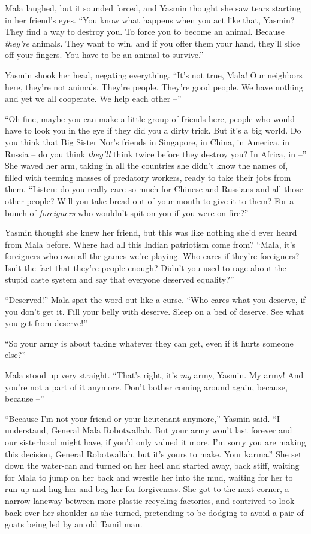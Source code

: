 Mala laughed, but it sounded forced, and Yasmin thought she saw
tears starting in her friend's eyes. ``You know what happens when
you act like that, Yasmin? They find a way to destroy you. To force
you to become an animal. Because \emph{they're} animals. They want
to win, and if you offer them your hand, they'll slice off your
fingers. You have to be an animal to survive.''

Yasmin shook her head, negating everything. ``It's not true, Mala!
Our neighbors here, they're not animals. They're people. They're
good people. We have nothing and yet we all cooperate. We help each
other --''

``Oh fine, maybe you can make a little group of friends here, people
who would have to look you in the eye if they did you a dirty
trick. But it's a big world. Do you think that Big Sister Nor's
friends in Singapore, in China, in America, in Russia -- do you
think \emph{they'll} think twice before they destroy you? In
Africa, in --'' She waved her arm, taking in all the countries she
didn't know the names of, filled with teeming masses of predatory
workers, ready to take their jobs from them. ``Listen: do you really
care so much for Chinese and Russians and all those other people?
Will you take bread out of your mouth to give it to them? For a
bunch of \emph{foreigners} who wouldn't spit on you if you were on
fire?''

Yasmin thought she knew her friend, but this was like nothing she'd
ever heard from Mala before. Where had all this Indian patriotism
come from? ``Mala, it's foreigners who own all the games we're
playing. Who cares if they're foreigners? Isn't the fact that
they're people enough? Didn't you used to rage about the stupid
caste system and say that everyone deserved equality?''

``Deserved!'' Mala spat the word out like a curse. ``Who cares what
you deserve, if you don't get it. Fill your belly with deserve.
Sleep on a bed of deserve. See what you get from deserve!''

``So your army is about taking whatever they can get, even if it
hurts someone else?''

Mala stood up very straight. ``That's right, it's \emph{my} army,
Yasmin. My army! And you're not a part of it anymore. Don't bother
coming around again, because, because --''

``Because I'm not your friend or your lieutenant anymore,'' Yasmin
said. ``I understand, General Mala Robotwallah. But your army won't
last forever and our sisterhood might have, if you'd only valued it
more. I'm sorry you are making this decision, General Robotwallah,
but it's yours to make. Your karma.'' She set down the water-can and
turned on her heel and started away, back stiff, waiting for Mala
to jump on her back and wrestle her into the mud, waiting for her
to run up and hug her and beg her for forgiveness. She got to the
next corner, a narrow laneway between more plastic recycling
factories, and contrived to look back over her shoulder as she
turned, pretending to be dodging to avoid a pair of goats being led
by an old Tamil man.

